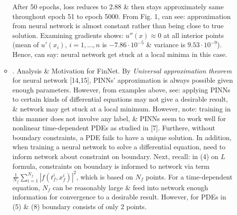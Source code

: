 \documentclass{article}
\begin{document}
\begin{itemize}
\begin{itemize}
		After 50 epochs, loss reduces to 2.88 \& then stays approximately same throughout epoch 51 to epoch 5000. From {\sf Fig. 1}, can see: approximation from neural network is almost constant rather than being close to true solution. Examining gradients shows: $u''(x)\approx0$ at all interior points (mean of $u'(x_i)$, $i = 1,\ldots,n$ is $-7.86\cdot10^{-5}$ \& variance is $9.53\cdot10^{-9}$). Hence, can say: neural network get stuck at a local minima in this case.
		\item {. Analysis \& Motivation for FinNet.} By {\it Universal approximation theorem} for neural network [14,15], PINNs' approximation is always possible given enough parameters. However, from examples above, see: applying PINNs to certain kinds of differential equations may not give a desirable result, \& network may get stuck at a local minimum. However, note: training in this manner does not involve any label, \& PINNs seem to work well for nonlinear time-dependent PDEs as studied in [7]. Furthere, without boundary constraints, a PDE fails to have a unique solution. In addition, when training a neural network to solve a differential equation, need to inform network about constraint on boundary. Next, recall: in (4) on $L$ formula, constraints on boundary is informed to network via term $\frac{1}{N_f}\sum_{i=1}^{N_f} |f(t_f^i,x_f^i)|^2$, which is based on $N_f$ points. For a time-dependent equation, $N_f$ can be reasonably large \& feed into network enough information for convergence to a desirable result. However, for PDEs in (5) \& (8) boundary consists of only 2 points.


\end{itemize}
\end{itemize}
\end{document}
